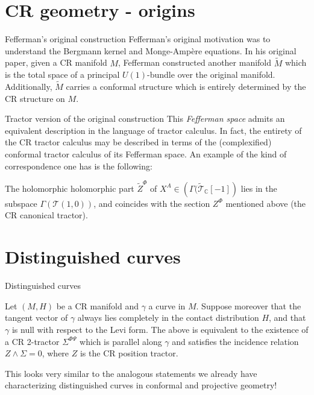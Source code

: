 \documentclass{beamer}
\newcommand{\CC}{\mathbb{C}}
\begin{document}
\section{CR geometry - origins}

\begin{frame}{Fefferman's original construction}
  Fefferman's original motivation was to understand the Bergmann kernel and
  Monge-Amp\`{e}re equations.
  \vfill
  \pause
  In his original paper, given a CR manifold $M$, Fefferman
  constructed another manifold $\tilde{M}$ which is the total space of a principal
  $U(1)$-bundle over the original manifold.
  \vfill
  \pause
  Additionally, $\tilde{M}$ carries a conformal structure which is entirely
  determined by the CR structure on $M$.
\end{frame}

\begin{frame}{Tractor version of the original construction}
  This \emph{Fefferman space} admits an equivalent description in the
  language of tractor calculus.
  \vfill
  In fact, the entirety of the CR tractor calculus may be described in terms of the (complexified) conformal tractor calculus of its Fefferman space.
  \vfill 
  \pause
  An example of the kind of correspondence one has is the following:
  \vfill
  \begin{theorem}[\v{C}ap-Gover, 2008]
    The holomorphic holomorphic part $\tilde{Z}^\Phi$ of $X^A \in \left(\Gamma(\tilde{\mathcal{T}}_\CC [-1]\right)$ lies in the subspace $\Gamma(\mathcal{T}(1,0))$, and coincides with the section $Z^\Phi$ mentioned above (the CR canonical tractor).
  \end{theorem}
\end{frame}

\section{Distinguished curves}

\begin{frame}{Distinguished curves}
  \begin{theorem}[Gover-S, 2019]
    Let $(M,H)$ be a CR manifold and $\gamma$ a curve in $M$. 
    Suppose moreover that the tangent vector of $\gamma$ always lies
    completely in the contact distribution $H$, and that $\gamma$ is null with
    respect to the Levi form. 
    The above is equivalent to the existence of a CR 2-tractor $\Sigma^{\Phi\Psi}$ which
    is parallel along $\gamma$ and satisfies the incidence relation $Z \wedge
    \Sigma = 0$, where $Z$ is the CR position tractor.
  \end{theorem}
  \vfill
  \pause
  This looks very similar to the analogous statements we already
  have characterizing distinguished curves in conformal and projective geometry!

\end{frame}
\end{document}
